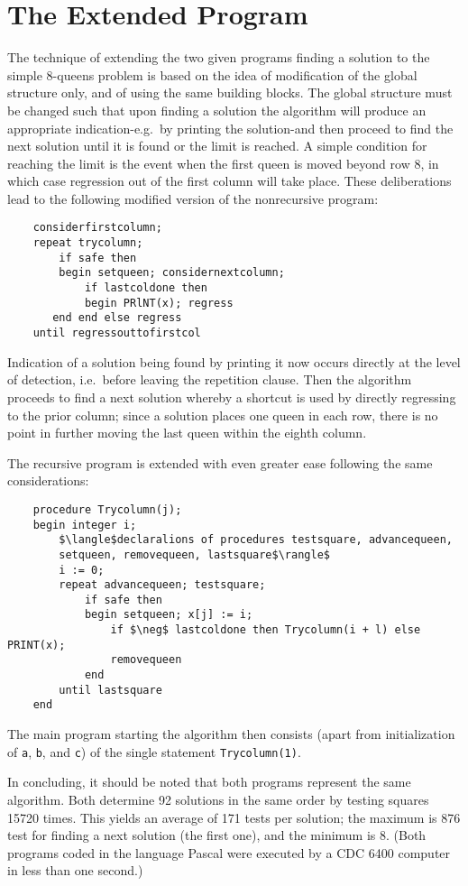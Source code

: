 \section{The Extended Program}

The technique of extending the two given programs finding a solution to the
simple 8-queens problem is based on the idea of modification of the global
structure only, and of using the same building blocks. The global structure
must be changed such that upon finding a solution the algorithm will produce an
appropriate indication-e.g.\ by printing the solution-and then proceed to find
the next solution until it is found or the limit is reached.  A simple
condition for reaching the limit is the event when the first queen is moved
beyond row 8, in which case regression out of the first column will take
place.  These deliberations lead to the following modified version of the
nonrecursive program:

\begin{lstlisting}
    considerfirstcolumn;
    repeat trycolumn;
        if safe then
        begin setqueen; considernextcolumn;
            if lastcoldone then
            begin PRlNT(x); regress
       end end else regress
    until regressouttofirstcol
\end{lstlisting}

Indication of a solution being found by printing it now occurs directly at
the level of detection, i.e.\ before leaving the repetition clause.  Then
the algorithm proceeds to find a next solution whereby a shortcut is used
by directly regressing to the prior column; since a solution places one
queen in each row, there is no point in further moving the last queen
within the eighth column.

The recursive program is extended with even greater ease following the same
considerations:

\begin{lstlisting}
    procedure Trycolumn(j);
    begin integer i;
        $\langle$declaralions of procedures testsquare, advancequeen,
        setqueen, removequeen, lastsquare$\rangle$
        i := 0;
        repeat advancequeen; testsquare;
            if safe then
            begin setqueen; x[j] := i;
                if $\neg$ lastcoldone then Trycolumn(i + l) else PRINT(x);
                removequeen
            end
        until lastsquare
    end
\end{lstlisting}

The main program starting the algorithm then consists (apart from
initialization of \verb|a|, \verb|b|, and \verb|c|) of the single statement
\verb|Trycolumn(1)|.

In concluding, it should be noted that both programs represent the same
algorithm. Both determine 92 solutions in the same order by testing squares
15720 times. This yields an average of 171 tests per solution; the maximum is
876 test for finding a next solution (the first one), and the minimum is 8.
(Both programs coded in the language Pascal were executed by a CDC 6400
computer in less than one second.)

